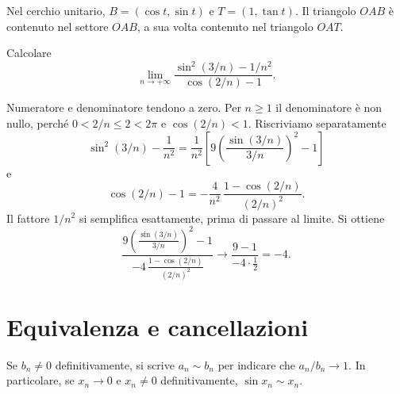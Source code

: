 \begin{schema}
\par\smallskip Nel cerchio unitario, $B=(\cos t,\sin t)$ e $T=(1,\tan t)$. Il triangolo $OAB$ è contenuto nel settore $OAB$, a sua volta contenuto nel triangolo $OAT$.
\end{schema}

\begin{esercizio}
Calcolare
\[
\lim_{n\to+\infty}\frac{\sin^2(3/n)-1/n^2}{\cos(2/n)-1}.
\]
\end{esercizio}
\begin{svolgimento}
Numeratore e denominatore tendono a zero. Per $n\ge1$ il denominatore è non nullo, perché $0<2/n\le2<2\pi$ e $\cos(2/n)<1$. Riscriviamo separatamente
\[
\sin^2(3/n)-\frac1{n^2}
=\frac1{n^2}\left[9\left(\frac{\sin(3/n)}{3/n}\right)^2-1\right]
\]
e
\[
\cos(2/n)-1
=-\frac4{n^2}\,\frac{1-\cos(2/n)}{(2/n)^2}.
\]
Il fattore $1/n^2$ si semplifica esattamente, prima di passare al limite. Si ottiene
\[
\frac{9\left(\frac{\sin(3/n)}{3/n}\right)^2-1}
{-4\,\frac{1-\cos(2/n)}{(2/n)^2}}
\longrightarrow\frac{9-1}{-4\cdot\frac12}=-4.
\]
\end{svolgimento}

\section{Equivalenza e cancellazioni}

\begin{definizione}
Se $b_n\ne0$ definitivamente, si scrive $a_n\sim b_n$ per indicare che $a_n/b_n\to1$. In particolare, se $x_n\to0$ e $x_n\ne0$ definitivamente, $\sin x_n\sim x_n$.
\end{definizione}

